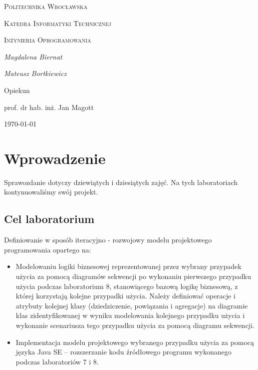 \documentclass{article}
\begin{document}
	
	\begin{titlepage}
		\centering
		{\scshape\LARGE Politechnika Wrocławska \par}
		{\scshape\Large Katedra Informatyki Technicznej\par}
		
		\vspace{1cm}
		{\scshape\Large Inżynieria Oprogramowania\par}
		\vspace{1.5cm}
		{\huge\bfseries \par}
		\vspace{2cm}
		{\Large\itshape Magdalena Biernat\par}
		{\Large\itshape Mateusz Bortkiewicz\par}
		\vfill
		Opiekun\par
		prof. dr hab. inż. Jan Magott 
		
		\vfill
		{\large \today\par}
	\end{titlepage}
	\newpage
	
	\section{Wprowadzenie}
	Sprawozdanie dotyczy dziewiątych i dziesiątych zajęć. Na tych laboratoriach kontynuowaliśmy swój projekt. 
	
	\subsection{Cel laboratorium}
	Definiowanie w sposób iteracyjno - rozwojowy modelu projektowego
	programowania opartego na:
	\begin{itemize}
		\item Modelowaniu logiki biznesowej reprezentowanej przez wybrany
		przypadek użycia za pomocą diagramów sekwencji po wykonaniu
		pierwszego przypadku użycia podczas laboratorium 8, stanowiącego
		bazową logikę biznesową, z której korzystają kolejne przypadki użycia.
		Należy definiować operacje i atrybuty kolejnej klasy (dziedziczenie,
		powiązania i agregacje) na diagramie klas zidentyfikowanej w wyniku
		modelowania kolejnego przypadku użycia i wykonanie scenariusza tego
		przypadku użycia za pomocą diagramu sekwencji.
		\item Implementacja modelu projektowego wybranego przypadku użycia za
		pomocą języka Java SE – rozszerzanie kodu źródłowego programu
		wykonanego podczas laboratoriów 7 i 8.
	\end{itemize}
\end{document}
